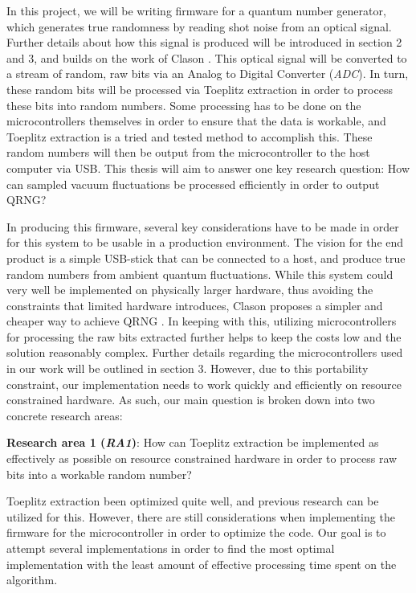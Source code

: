 \documentclass{sigchi}
\begin{document}
In this project, we will be writing firmware for a quantum number generator, which generates true randomness by reading shot noise from an optical signal. Further details about how this signal is produced will be introduced in section 2 and 3, and builds on the work of Clason \cite{Clason2023}. This optical signal will be converted to a stream of random, raw bits via an Analog to Digital Converter (\emph{ADC}). In turn, these random bits will be processed via Toeplitz extraction \cite{toeplitz} in order to process these bits into random numbers. Some processing has to be done on the microcontrollers themselves in order to ensure that the data is workable, and Toeplitz extraction is a tried and tested method to accomplish this. These random numbers will then be output from the microcontroller to the host computer via USB. This thesis will aim to answer one key research question: How can sampled vacuum fluctuations be processed efficiently in order to output QRNG?

In producing this firmware, several key considerations have to be made in order for this system to be usable in a production environment. The vision for the end product is a simple USB-stick that can be connected to a host, and produce true random numbers from ambient quantum fluctuations. While this system could very well be implemented on physically larger hardware, thus avoiding the constraints that limited hardware introduces, Clason proposes a simpler and cheaper way to achieve QRNG \cite{Clason2023}. In keeping with this, utilizing microcontrollers for processing the raw bits extracted further helps to keep the costs low and the solution reasonably complex. Further details regarding the microcontrollers used in our work will be outlined in section 3. However, due to this portability constraint, our implementation needs to work quickly and efficiently on resource constrained hardware. As such, our main question is broken down into two concrete research areas:

\textbf{Research area 1 (\emph{RA1})}: How can Toeplitz extraction be implemented as effectively as possible on resource constrained hardware in order to process raw bits into a workable random number?

Toeplitz extraction been optimized quite well, and previous research can be utilized for this. However, there are still considerations when implementing the firmware for the microcontroller in order to optimize the code. Our goal is to attempt several implementations in order to find the most optimal implementation with the least amount of effective processing time spent on the algorithm.
\end{document}
